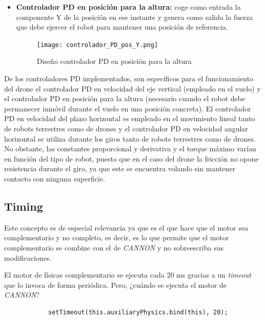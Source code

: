 \begin{itemize}
    \item \textbf{Controlador PD en posición para la altura:} coge como entrada la componente Y de la posición en ese instante y genera como salida la fuerza que debe ejercer el robot para mantener una posición de referencia. 
    
    \clearpage
    \begin{figure}[h!]
    \centering
    \texttt{[image: controlador\_PD\_pos\_Y.png]}
    \caption[Diseño controlador PD en posición para la altura]{Diseño controlador PD en posición para la altura\footnotemark}
    \label{fig:esquema_pd_5}
    \end{figure}
\end{itemize}

De los controladores PD implementados, son específicos para el funcionamiento del drone el controlador PD en velocidad del eje vertical (empleado en el vuelo) y el controlador PD en posición para la altura (necesario cuando el robot debe permanecer inmóvil durante el vuelo en una posición concreta). El controlador PD en velocidad del plano horizontal es empleado en el movimiento lineal tanto de robots terrestres como de drones y el controlador PD en velocidad angular horizontal se utiliza durante los giros tanto de robots terrestres como de drones. No obstante, las constantes proporcional y derivativa y el torque máximo varían en función del tipo de robot, puesto que en el caso del drone la fricción no opone resistencia durante el giro, ya que este se encuentra volando sin mantener contacto con ninguna superficie.
    
\normalsize
\subsection{Timing}
Este concepto es de especial relevancia ya que es el que hace que el motor sea complementario y no completo, es decir, es lo que permite que el motor complementario se combine con el de \textit{CANNON} y no sobreescriba sus modificaciones. \newline

El motor de físicas complementario se ejecuta cada 20 ms gracias a un \textit{timeout} que lo invoca de forma periódica. Pero, ¿cuándo se ejecuta el motor de \textit{CANNON}? 

\small {
\begin{verbatim}
            setTimeout(this.auxiliaryPhysics.bind(this), 20);
\end{verbatim}
}

